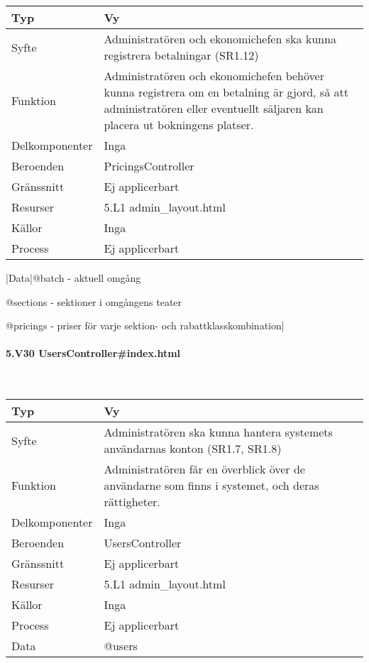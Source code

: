\documentclass[a4paper, twoside, 11pt, titlepage]{article}
\begin{document}
			\begin {table} [ht] \begin{tabular} {  p{3.5cm} p{9.6cm} }
				\hline
				Typ & Vy  \\
				\hline
				Syfte & Administratören och ekonomichefen ska kunna registrera betalningar (SR1.12)  \\
				\hline
				Funktion & Administratören och ekonomichefen behöver kunna registrera om en betalning är gjord, så att administratören eller eventuellt säljaren kan placera ut bokningens platser.  \\
				\hline
				Delkomponenter & Inga  \\
				\hline
				Beroenden & PricingsController  \\
				\hline
				Gränssnitt & Ej applicerbart  \\
				\hline
				Resurser & 5.L1 admin\_layout.html  \\
				\hline
				Källor & Inga  \\
				\hline
				Process & Ej applicerbart  \\
				\hline
			\end{tabular} \end{table} \FloatBarrier
			\vspace{6mm}

			|Data|@batch - aktuell omgång

			@sections - sektioner i omgångens teater

			@pricings - priser för varje sektion- och rabattklasskombination|

			\paragraph{5.V30 UsersController\#index.html}\

			\begin {table} [ht] \begin{tabular} {  p{3.5cm} p{9.6cm} }
				\hline
				Typ & Vy  \\
				\hline
				Syfte & Administratören ska kunna hantera systemets användarnas konton (SR1.7, SR1.8)  \\
				\hline
				Funktion & Administratören får en överblick över de användarne som finns i systemet, och deras rättigheter.  \\
				\hline
				Delkomponenter & Inga  \\
				\hline
				Beroenden & UsersController  \\
				\hline
				Gränssnitt & Ej applicerbart  \\
				\hline
				Resurser & 5.L1 admin\_layout.html  \\
				\hline
				Källor & Inga  \\
				\hline
				Process & Ej applicerbart  \\
				\hline
				Data & @users  \\
				\hline
			\end{tabular} \end{table} \FloatBarrier
\end{document}
